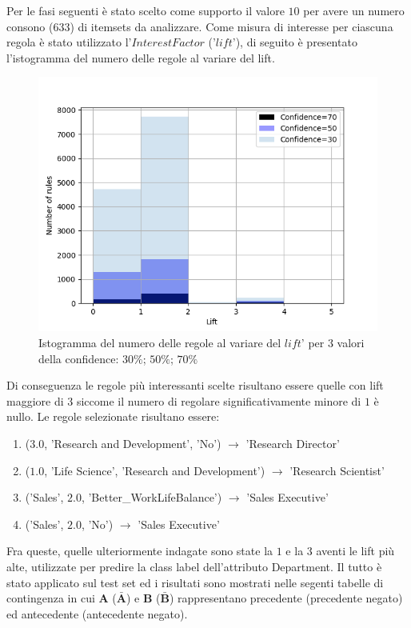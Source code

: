 \documentclass[a4paper,9pt]{article}
\begin{document}
Per le fasi seguenti è stato scelto come supporto il valore $10$ per avere un numero consono ($633$) di itemsets da analizzare.
Come misura di interesse per ciascuna regola è stato utilizzato l'$Interest Factor$ ('$lift$'), di seguito è presentato l'istogramma del numero delle regole al variare del lift.  

\begin{figure}[H]
    \centering
    \includegraphics[scale=0.70]{lifthistogram.png}
    \caption{Istogramma del numero delle regole al variare del $lift$' per $3$ valori della confidence: $30\%$; $50\%$; $70\%$}
    \label{fig:my_label}
\end{figure}

Di conseguenza le regole più interessanti scelte risultano essere quelle con lift maggiore di $3$ siccome il numero di regolare significativamente  minore di $1$ è nullo. Le regole selezionate risultano essere:

\begin{enumerate}
\item ($3.0$, 'Research and Development', 'No') $\longrightarrow$ 'Research Director'
\item ($1.0$, 'Life Science', 'Research and Development') $\longrightarrow$ 'Research Scientist'
\item ('Sales', $2.0$, 'Better\_WorkLifeBalance') $\longrightarrow$ 'Sales Executive'
\item ('Sales', $2.0$, 'No') $\longrightarrow$ 'Sales Executive'
\end{enumerate}

Fra queste, quelle ulteriormente indagate sono state la $1$ e la $3$ aventi le lift più alte, utilizzate per predire la class label dell'attributo Department. Il tutto è stato applicato sul test set ed i risultati sono mostrati nelle segenti tabelle di contingenza in cui \textbf {A}  ($\bar{\textbf {A}}$) e \textbf {B}  ($\bar{\textbf {B}}$) rappresentano precedente (precedente negato) ed antecedente (antecedente negato). 
\end{document}
